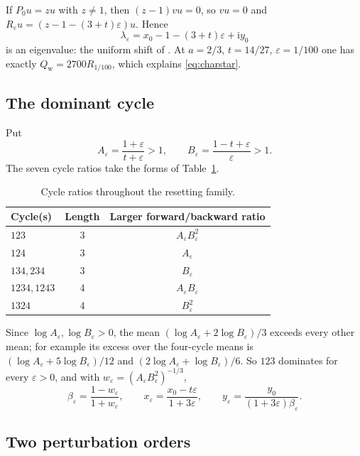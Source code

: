\documentclass[11pt,a4paper]{article}
\numberwithin{equation}{section}
\theoremstyle{definition}
\theoremstyle{remark}
\newcommand{\ii}{\mathrm{i}}
\newcommand{\eps}{\varepsilon}
\newcommand{\Qw}{Q_{\mathrm{w}}}
\begin{document}
If \(P_0u=zu\) with \(z\ne1\), then \((z-1)vu=0\), so \(vu=0\) and
\(R_\eps u=(z-1-(3+t)\eps)u\). Hence
\begin{equation}
\lambda_\eps=x_0-1-(3+t)\eps+\ii y_0
\label{eq:lambdafamily}
\end{equation}
is an eigenvalue: the uniform shift of \cite{rose2018}. At \(a=2/3\),
\(t=14/27\), \(\eps=1/100\) one has exactly \(\Qw=2700R_{1/100}\), which
explains \eqref{eq:charstar}.

\subsection{The dominant cycle}

Put
\begin{equation}
A_\eps=\frac{1+\eps}{t+\eps}>1,\qquad
B_\eps=\frac{1-t+\eps}{\eps}>1.
\label{eq:AB}
\end{equation}
The seven cycle ratios take the forms of Table~\ref{tab:symbolic}.

\begin{table}[ht]
\centering
\begin{tabular}{@{}lcc@{}}
\toprule
Cycle(s) & Length & Larger forward/backward ratio\\
\midrule
\(123\) & 3 & \(A_\eps B_\eps^2\)\\
\(124\) & 3 & \(A_\eps\)\\
\(134,234\) & 3 & \(B_\eps\)\\
\(1234,1243\) & 4 & \(A_\eps B_\eps\)\\
\(1324\) & 4 & \(B_\eps^2\)\\
\bottomrule
\end{tabular}
\caption{Cycle ratios throughout the resetting family.}
\label{tab:symbolic}
\end{table}

Since \(\log A_\eps,\log B_\eps>0\), the mean
\((\log A_\eps+2\log B_\eps)/3\) exceeds every other mean; for example
its excess over the four-cycle means is
\((\log A_\eps+5\log B_\eps)/12\) and \((2\log A_\eps+\log B_\eps)/6\).
So \(123\) dominates for every \(\eps>0\), and with
\(w_\eps=(A_\eps B_\eps^2)^{-1/3}\),
\begin{equation}
\beta_\eps=\frac{1-w_\eps}{1+w_\eps},\qquad
x_\eps=\frac{x_0-t\eps}{1+3\eps},\qquad
y_\eps=\frac{y_0}{(1+3\eps)\beta_\eps}.
\label{eq:xyfamily}
\end{equation}

\subsection{Two perturbation orders}
\end{document}
